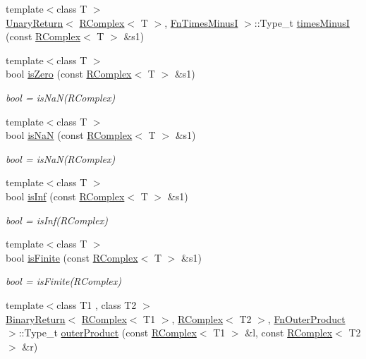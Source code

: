 \begin{DoxyCompactItemize}
{\footnotesize template$<$class T $>$ }\\\mbox{\hyperlink{structENSEM_1_1UnaryReturn}{Unary\+Return}}$<$ \mbox{\hyperlink{classENSEM_1_1RComplex}{R\+Complex}}$<$ T $>$, \mbox{\hyperlink{structENSEM_1_1FnTimesMinusI}{Fn\+Times\+MinusI}} $>$\+::Type\+\_\+t \mbox{\hyperlink{group__rcomplex_ga630dbd8479e9fe488cbf493531594f06}{times\+MinusI}} (const \mbox{\hyperlink{classENSEM_1_1RComplex}{R\+Complex}}$<$ T $>$ \&s1)
\item 
{\footnotesize template$<$class T $>$ }\\bool \mbox{\hyperlink{group__rcomplex_ga21235851ad3c6bba4973c55332baaa9e}{is\+Zero}} (const \mbox{\hyperlink{classENSEM_1_1RComplex}{R\+Complex}}$<$ T $>$ \&s1)
\begin{DoxyCompactList}\small\item\em bool = is\+Na\+N(\+R\+Complex) \end{DoxyCompactList}\item 
{\footnotesize template$<$class T $>$ }\\bool \mbox{\hyperlink{group__rcomplex_ga909986b087edfa0819ffe4b76d00ed42}{is\+NaN}} (const \mbox{\hyperlink{classENSEM_1_1RComplex}{R\+Complex}}$<$ T $>$ \&s1)
\begin{DoxyCompactList}\small\item\em bool = is\+Na\+N(\+R\+Complex) \end{DoxyCompactList}\item 
{\footnotesize template$<$class T $>$ }\\bool \mbox{\hyperlink{group__rcomplex_gabf9e4d305784028c682bdf06201dba86}{is\+Inf}} (const \mbox{\hyperlink{classENSEM_1_1RComplex}{R\+Complex}}$<$ T $>$ \&s1)
\begin{DoxyCompactList}\small\item\em bool = is\+Inf(\+R\+Complex) \end{DoxyCompactList}\item 
{\footnotesize template$<$class T $>$ }\\bool \mbox{\hyperlink{group__rcomplex_ga3152e73aedd89eafdfab17e0cb0363b5}{is\+Finite}} (const \mbox{\hyperlink{classENSEM_1_1RComplex}{R\+Complex}}$<$ T $>$ \&s1)
\begin{DoxyCompactList}\small\item\em bool = is\+Finite(\+R\+Complex) \end{DoxyCompactList}\item 
{\footnotesize template$<$class T1 , class T2 $>$ }\\\mbox{\hyperlink{structENSEM_1_1BinaryReturn}{Binary\+Return}}$<$ \mbox{\hyperlink{classENSEM_1_1RComplex}{R\+Complex}}$<$ T1 $>$, \mbox{\hyperlink{classENSEM_1_1RComplex}{R\+Complex}}$<$ T2 $>$, \mbox{\hyperlink{structENSEM_1_1FnOuterProduct}{Fn\+Outer\+Product}} $>$\+::Type\+\_\+t \mbox{\hyperlink{group__rcomplex_gaf9789ce4e93ec3781ea59cb4f44afe38}{outer\+Product}} (const \mbox{\hyperlink{classENSEM_1_1RComplex}{R\+Complex}}$<$ T1 $>$ \&l, const \mbox{\hyperlink{classENSEM_1_1RComplex}{R\+Complex}}$<$ T2 $>$ \&r)

\end{DoxyCompactItemize}
